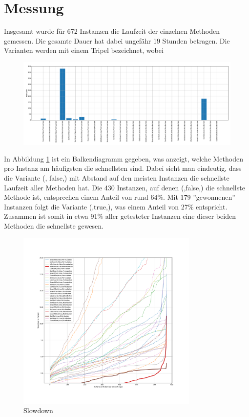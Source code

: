 \section{Messung}

Insgesamt wurde für 672 Instanzen die Laufzeit der einzelnen Methoden gemessen. Die gesamte Dauer
hat dabei  ungefähr 19 Stunden betragen. Die Varianten werden mit einem Tripel bezeichnet,
wobei 
\begin{figure}[h]
\centering
	\includegraphics[width = \textwidth]{figures/counting.pdf}
	\caption{}
	\label{fig:messung_counting}
\end{figure}
In Abbildung \ref{fig:messung_counting} ist ein Balkendiagramm gegeben, was anzeigt, welche Methoden
pro Instanz am häufigsten die schnellsten sind. Dabei sieht man eindeutig, dass die Variante (\SeaUSet,
false,\perm) mit Abstand auf den meisten Instanzen die schnellste Laufzeit aller Methoden hat. Die
430 Instanzen, auf denen (\SeaUSet,false,\perm) die schnellste Methode ist, entsprechen einem Anteil von rund
64\%. Mit 179 ''gewonnenen'' Instanzen folgt die Variante (\SorSor,true,\distr), was einem Anteil von
27\% entspricht. Zusammen ist somit in etwa 91\% aller getesteter Instanzen eine dieser beiden Methoden
die schnellste gewesen.


\begin{figure}[h]
\centering
	\includegraphics[width = 0.8\textwidth]{figures/slowdown.pdf}
	\caption{Slowdown}
	\label{fig:messung_slowdown}
\end{figure}



